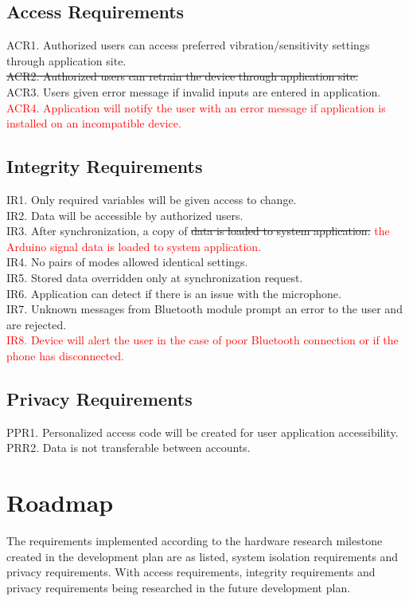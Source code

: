 \documentclass[12pt, titlepage]{article}
\begin{document}
\subsection{Access Requirements}

ACR1. Authorized users can access preferred vibration/sensitivity settings through application site.
\sout{\\ACR2. Authorized users can retrain the device through application site.}
\\ACR3. Users given error message if invalid inputs are entered in application.
\\\textcolor{red}{ACR4. Application will notify the user with an error message if application is installed on an incompatible device.}

\subsection{Integrity Requirements}

IR1. Only required variables will be given access to change.
\\IR2. Data will be accessible by authorized users.
\\ IR3. After synchronization, a copy of \sout{data is loaded to system application.} \textcolor{red}{the Arduino signal data is loaded to system application.}
\\IR4. No pairs of modes allowed identical settings.
\\IR5. Stored data overridden only at synchronization request.
\\IR6. Application can detect if there is an issue with the microphone.
\\IR7. Unknown messages from Bluetooth module prompt an error to the user and are rejected.
\\\textcolor{red}{IR8. Device will alert the user in the case of poor Bluetooth connection or if the phone has disconnected.}
\subsection{Privacy Requirements}

PPR1. Personalized access code will be created for user application accessibility. 
\\PRR2. Data is not transferable between accounts.


\section{Roadmap}

The requirements implemented according to the hardware research milestone created in the development plan are as listed, system isolation requirements and privacy requirements. With access requirements, integrity requirements and privacy requirements being researched in the future development plan.
\end{document}
